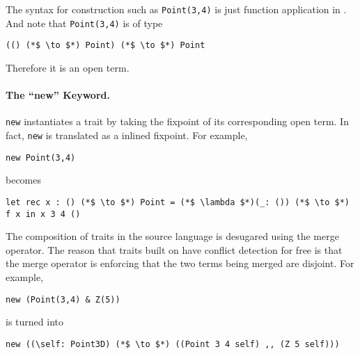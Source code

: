 The syntax for construction such as \lstinline$Point(3,4)$ is just function
application in \name. And note that \lstinline$Point(3,4)$ is of type
\begin{lstlisting}
(() (*$ \to $*) Point) (*$ \to $*) Point
\end{lstlisting}

Therefore it is an open term.


\paragraph{The ``new'' Keyword.} \lstinline$new$ instantiates a trait by taking the
fixpoint of its corresponding open term. In fact, \lstinline$new$ is translated as
a inlined fixpoint. For example,

\begin{lstlisting}
new Point(3,4)
\end{lstlisting}

becomes

\begin{lstlisting}
let rec x : () (*$ \to $*) Point = (*$ \lambda $*)(_: ()) (*$ \to $*) f x in x 3 4 ()
\end{lstlisting}

The composition of traits in the source language is desugared using the merge
operator. The reason that traits built on \name have conflict detection for free
is that the merge operator is enforcing that the two terms being merged are
disjoint. For example,

\begin{lstlisting}
new (Point(3,4) & Z(5))
\end{lstlisting}

is turned into

\begin{lstlisting}
new ((\self: Point3D) (*$ \to $*) ((Point 3 4 self) ,, (Z 5 self)))
\end{lstlisting}

